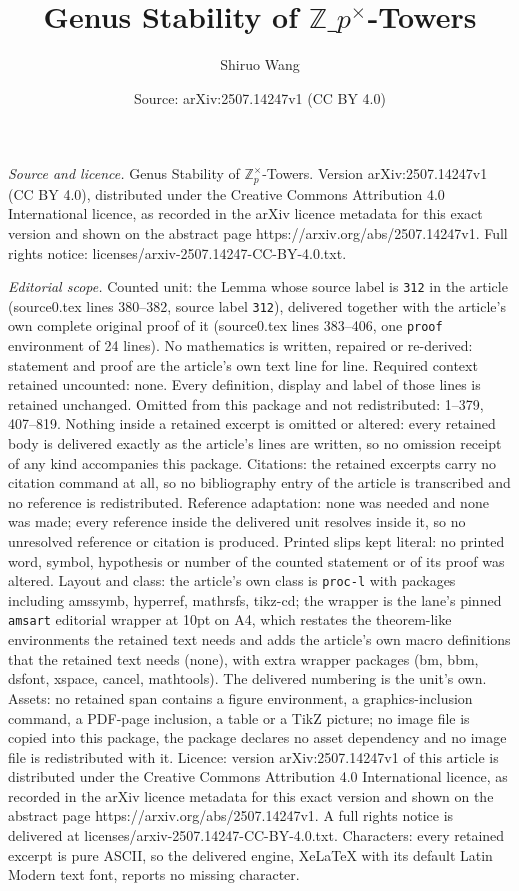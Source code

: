 \documentclass[10pt,a4paper]{amsart}
\title[Genus Stability of $\mathbb Z\_p^\times$-Towers]{Genus Stability of $\mathbb Z\_p^\times$-Towers}
\author{Shiruo Wang}
\date{Source: arXiv:2507.14247v1 (CC BY 4.0)}
\begin{document}
\maketitle

\noindent\emph{Source and licence.} Genus Stability of $\mathbb Z_p^\times$-Towers. Version arXiv:2507.14247v1 (CC BY 4.0), distributed under the Creative Commons Attribution 4.0 International licence, as recorded in the arXiv licence metadata for this exact version and shown on the abstract page https://arxiv.org/abs/2507.14247v1. Full rights notice: licenses/arxiv-2507.14247-CC-BY-4.0.txt.\par\smallskip

\noindent\textit{Editorial scope.} Counted unit: the Lemma whose source label is \texttt{312} in the article (source0.tex lines 380--382, source label \texttt{312}), delivered together with the article's own complete original proof of it (source0.tex lines 383--406, one \texttt{proof} environment of 24 lines). No mathematics is written, repaired or re-derived: statement and proof are the article's own text line for line. Required context retained uncounted: none. Every definition, display and label of those lines is retained unchanged. Omitted from this package and not redistributed: 1--379, 407--819. Nothing inside a retained excerpt is omitted or altered: every retained body is delivered exactly as the article's lines are written, so no omission receipt of any kind accompanies this package. Citations: the retained excerpts carry no citation command at all, so no bibliography entry of the article is transcribed and no reference is redistributed. Reference adaptation: none was needed and none was made; every reference inside the delivered unit resolves inside it, so no unresolved reference or citation is produced. Printed slips kept literal: no printed word, symbol, hypothesis or number of the counted statement or of its proof was altered. Layout and class: the article's own class is \texttt{proc-l} with packages including amssymb, hyperref, mathrsfs, tikz-cd; the wrapper is the lane's pinned \texttt{amsart} editorial wrapper at 10pt on A4, which restates the theorem-like environments the retained text needs and adds the article's own macro definitions that the retained text needs (none), with extra wrapper packages (bm, bbm, dsfont, xspace, cancel, mathtools). The delivered numbering is the unit's own. Assets: no retained span contains a figure environment, a graphics-inclusion command, a PDF-page inclusion, a table or a TikZ picture; no image file is copied into this package, the package declares no asset dependency and no image file is redistributed with it. Licence: version arXiv:2507.14247v1 of this article is distributed under the Creative Commons Attribution 4.0 International licence, as recorded in the arXiv licence metadata for this exact version and shown on the abstract page https://arxiv.org/abs/2507.14247v1. A full rights notice is delivered at licenses/arxiv-2507.14247-CC-BY-4.0.txt. Characters: every retained excerpt is pure ASCII, so the delivered engine, XeLaTeX with its default Latin Modern text font, reports no missing character.
\end{document}
